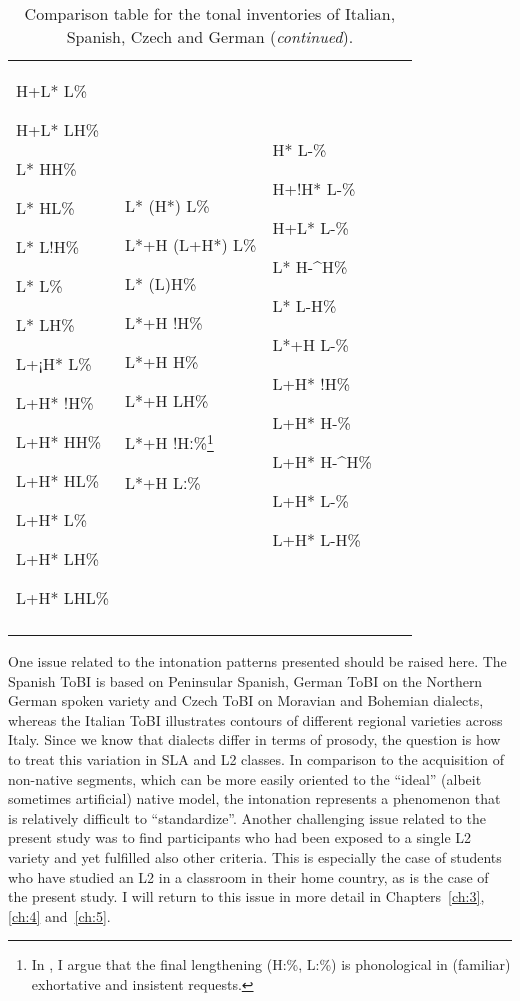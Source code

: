 \begin{table}[p]
\begin{tabularx}{\textwidth}{p{}QQQQ}
{ H+L* L\%}

{ H+L* LH\%}

{ L* HH\%}

{ L* HL\%}

{ L* L!H\%}

{ L* L\%}

{ L* LH\%}

{ L+¡H* L\%}

{ L+H* !H\%}

{ L+H* HH\%}

{ L+H* HL\%}

{ L+H* L\%}

{ L+H* LH\%}

 L+H* LHL\% & { L* (H*) L\%}

{ L*+H (L+H*) L\%}

{ L* (L)H\%}

{ L*+H !H\%}

{ L*+H H\%}

{ L*+H LH\%}

{ L*+H !Hː\%\footnote{In \citet{PeškováEtAl2017}, I argue that the final lengthening (H:\%, L:\%) is phonological in (familiar) exhortative and insistent requests.}}

{ L*+H Lː\%}  & { H* L-\%}

{ H+!H* L-\%}

{ H+L* L-\%}

{ L* H-\^{}H\%}

{ L* L-H\%}

{ L*+H L-\%}

{ L+H* !H\%}

{ L+H* H-\%}

{ L+H* H-\^{}H\%}

{ L+H* L-\%}

 L+H* L-H\%\\
\lspbottomrule
\end{tabularx}
\caption{Comparison table for the tonal inventories of Italian, Spanish, Czech and German (\textit{continued}).\label{tab:2.8b}}
\end{table}

One issue related to the intonation patterns presented should be raised here. The Spanish ToBI is based on Peninsular Spanish, German ToBI on the Northern German spoken variety and Czech ToBI on Moravian and Bohemian dialects, whereas the Italian ToBI illustrates contours of different regional varieties across Italy. Since we know that dialects differ in terms of prosody, the question is how to treat this variation in SLA and L2 classes. In comparison to the acquisition of non-native segments, which can be more easily oriented to the “ideal” (albeit sometimes artificial) native model, the intonation represents a phenomenon that is relatively difficult to “standardize”. Another challenging issue related to the present study was to find participants who had been exposed to a single L2 variety and yet fulfilled also other criteria. This is especially the case of students who have studied an L2 in a classroom in their home country, as is the case of the present study. I will return to this issue in more detail in Chapters~\ref{ch:3}, \ref{ch:4} and~\ref{ch:5}.


